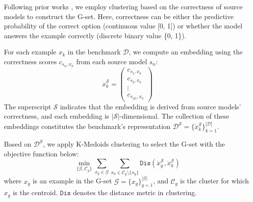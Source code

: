 Following prior works \citep{AP}, we employ clustering based on the correctness of source models to construct the G-set. Here, correctness can be either the predictive probability of the correct option (continuous value [0, 1]) or whether the model answers the example correctly (discrete binary value \{0, 1\}).

For each example $x_k$ in the benchmark $\mathcal{D}$, we compute an embedding using the correctness scores $c_{s_n,x_k}$ from each source model $s_n$:
\begin{equation}
    \dot{x}_{k}^{\mathcal{S}} = \begin{pmatrix} c_{s_1, x_k} \\ c_{s_2, x_k} \\ \vdots \\ c_{s_{|\mathcal{S}|}, x_k} \end{pmatrix}
\end{equation}
The superscript $\mathcal{S}$ indicates that the embedding is derived from source models' correctness, and each embedding is $|\mathcal{S}|$-dimensional. The collection of these embeddings constitutes the benchmark's representation $\mathcal{D}^{\mathcal{S}} = \{\dot{x}_k^\mathcal{S}\}_{k=1}^{|\mathcal{D}|}$.


Based on $\mathcal{D}^{\mathcal{S}}$, we apply K-Medoids clustering \citep{pam} to select the G-set with the objective function below:
\begin{equation}
    \label{eq1}
    \min_{\{\mathcal{G}, \mathcal{C}_{g}\}} \sum_{x_{g} \in \mathcal{G}} \sum_{x_{k} \in \mathcal{C}_{g} \setminus \{x_{g}\}} \texttt{Dis} (\dot{x}_{g}^{\mathcal{S}}, \dot{x}_{k}^{\mathcal{S}})
\end{equation}
where $x_{g}$ is an example in the G-set $\mathcal{G} = \{x_{g}\}_{g=1}^{|\mathcal{G}|}$, and $\mathcal{C}_{g}$ is the cluster for which $x_{g}$ is the centroid. 
$\texttt{Dis}$ denotes the distance metric in clustering.

